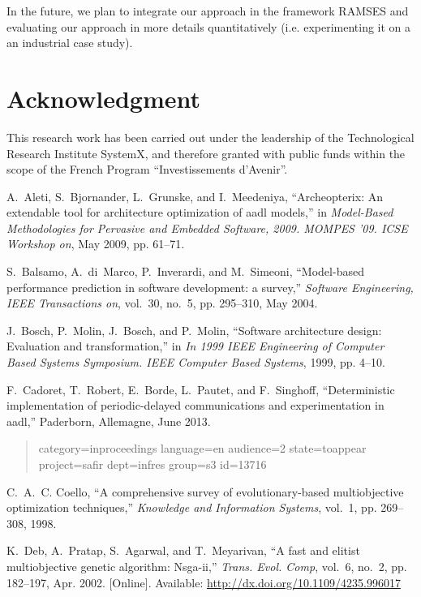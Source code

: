 \documentclass[conference]{IEEEtran}
\begin{document}
In the future, we plan to integrate our approach in the framework RAMSES and evaluating our approach in more details quantitatively (i.e. experimenting it on a an industrial case study)\cite{pautet:Cadoret2013}.

\section{Acknowledgment}
This research work has been carried out under the leadership of the Technological Research Institute SystemX, and therefore granted with public funds within the scope of the French Program ``Investissements d'Avenir''.

\begin{thebibliography}{1}

A.~Aleti, S.~Bjornander, L.~Grunske, and I.~Meedeniya, ``Archeopterix: An
  extendable tool for architecture optimization of aadl models,'' in
  \emph{Model-Based Methodologies for Pervasive and Embedded Software, 2009.
  MOMPES '09. ICSE Workshop on}, May 2009, pp. 61--71.

S.~Balsamo, A.~di~Marco, P.~Inverardi, and M.~Simeoni, ``Model-based
  performance prediction in software development: a survey,'' \emph{Software
  Engineering, IEEE Transactions on}, vol.~30, no.~5, pp. 295--310, May 2004.

J.~Bosch, P.~Molin, J.~Bosch, and P.~Molin, ``Software architecture design:
  Evaluation and transformation,'' in \emph{In 1999 IEEE Engineering of
  Computer Based Systems Symposium. IEEE Computer Based Systems}, 1999, 
  pp. 4--10.

F.~{Cadoret}, T.~{Robert}, E.~{Borde}, L.~{Pautet}, and F.~{Singhoff},
  ``Deterministic implementation of periodic-delayed communications and
  experimentation in aadl,'' Paderborn, Allemagne, June 2013.
 \begin{quotation}\noindent category=inproceedings language=en audience=2
  state=toappear project=safir dept=infres group=s3 id=13716 \end{quotation}

C.~A.~C. Coello, ``A comprehensive survey of evolutionary-based multiobjective
  optimization techniques,'' \emph{Knowledge and Information Systems}, vol.~1,
  pp. 269--308, 1998.

K.~Deb, A.~Pratap, S.~Agarwal, and T.~Meyarivan, ``A fast and elitist
  multiobjective genetic algorithm: Nsga-ii,'' \emph{Trans. Evol. Comp},
  vol.~6, no.~2, pp. 182--197, Apr. 2002. [Online]. Available:
  \url{http://dx.doi.org/10.1109/4235.996017}


\end{thebibliography}
\end{document}
